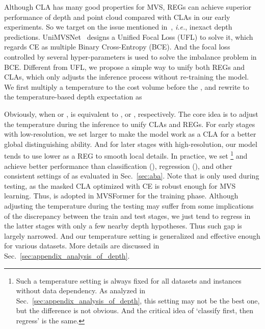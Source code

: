 \documentclass[10pt]{article} \usepackage[preprint]{tmlr}
\begin{document}
Although CLA has many good properties for MVS, REGs can achieve superior performance of depth and point cloud compared with CLAs in our early experiments.
So we target on the issue mentioned in~\citet{peng2022rethinking}, \emph{i.e.}, inexact depth predictions. 
UniMVSNet~\citep{peng2022rethinking} designs a Unified Focal Loss (UFL) to solve it, which regards CE as multiple Binary Cross-Entropy (BCE). And the focal loss~\citep{lin2017focal} controlled by several hyper-parameters is used to solve the imbalance problem in BCE. Different from UFL, we propose a simple way to unify both REGs and CLAs, which only adjusts the inference process without re-training the model. We first multiply a temperature  to the cost volume  before the , and rewrite  to the temperature-based depth expectation  as

Obviously, when  or ,   is equivalent to  , or , respectively. 
The core idea is to adjust the temperature  during the inference to unify CLAs and REGs. For early stages with low-resolution, we set larger  to make the model work as a CLA for a better global distinguishing ability. And for later stages with high-resolution, our model tends to use lower  as a REG to smooth local details. In practice, we set \footnote{\scriptsize{Such a temperature setting is always fixed for all datasets and instances without data dependency. As analyzed in Sec.~\ref{sec:appendix_analysis_of_depth}, this setting may not be the best one, but the difference is not obvious. And the critical idea of `classify first, then regress' is the same.}} and achieve better performance than classification (), regression (), and other consistent settings of  as evaluated in Sec.~\ref{sec:aba}.
Note that  is only used during testing, as the masked CLA optimized with CE is robust enough for MVS learning. Thus,  is adopted in MVSFormer for the training phase. 
Although adjusting the temperature during the testing may suffer from some implications of the discrepancy between the train and test stages, we just tend to regress in the latter stages with only a few nearby depth hypotheses. Thus such gap is largely narrowed. And our temperature setting is generalized and effective enough for various datasets. More details are discussed in Sec.~\ref{sec:appendix_analysis_of_depth}.
\end{document}

